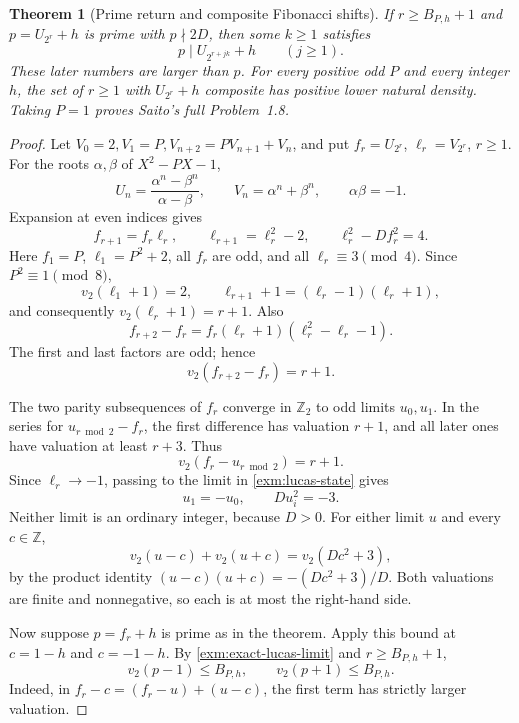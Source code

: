\documentclass[11pt,a4paper]{article}
\numberwithin{equation}{section}
\newtheorem{theorem}{Theorem}[section]
\theoremstyle{definition}
\theoremstyle{remark}
\begin{document}
\begin{theorem}[Prime return and composite Fibonacci shifts]
\label{exm:fib-theorem}
If \(r\ge B_{P,h}+1\) and \(p=U_{2^r}+h\) is prime with
\(p\nmid2D\), then some \(k\ge1\) satisfies
\[
 p\mid U_{2^{r+jk}}+h\qquad(j\ge1).
\]
These later numbers are larger than \(p\).
For every positive odd \(P\) and every integer \(h\),
the set of \(r\ge1\) with \(U_{2^r}+h\) composite has
positive lower natural density. Taking \(P=1\) proves
Saito's full Problem~1.8.
\end{theorem}
\begin{proof}
Let \(V_0=2,V_1=P,V_{n+2}=PV_{n+1}+V_n\), and put
\(f_r=U_{2^r}\), \(\ell_r=V_{2^r}\), \(r\ge1\).
For the roots \(\alpha,\beta\) of \(X^2-PX-1\),
\[
 U_n=\frac{\alpha^n-\beta^n}{\alpha-\beta},
 \qquad V_n=\alpha^n+\beta^n,\qquad \alpha\beta=-1.
\]
Expansion at even indices gives
\begin{equation}\label{exm:lucas-state}
 f_{r+1}=f_r\ell_r,\qquad
 \ell_{r+1}=\ell_r^2-2,\qquad
 \ell_r^2-Df_r^2=4.
\end{equation}
Here \(f_1=P\), \(\ell_1=P^2+2\), all \(f_r\) are odd,
and all \(\ell_r\equiv3\pmod4\).
Since \(P^2\equiv1\pmod8\),
\[
 v_2(\ell_1+1)=2,\qquad
 \ell_{r+1}+1=(\ell_r-1)(\ell_r+1),
\]
and consequently \(v_2(\ell_r+1)=r+1\). Also
\[
 f_{r+2}-f_r
 =f_r(\ell_r+1)(\ell_r^2-\ell_r-1).
\]
The first and last factors are odd; hence
\begin{equation}\label{exm:lucas-rate}
 v_2(f_{r+2}-f_r)=r+1.
\end{equation}

The two parity subsequences of \(f_r\) converge in
\(\mathbb Z_2\) to odd limits \(u_0,u_1\). In the
series for \(u_{r\bmod2}-f_r\), the first difference
has valuation \(r+1\), and all later ones have valuation
at least \(r+3\). Thus
\begin{equation}\label{exm:exact-lucas-limit}
 v_2(f_r-u_{r\bmod2})=r+1.
\end{equation}
Since \(\ell_r\to-1\), passing to the limit in
\eqref{exm:lucas-state} gives
\[
 u_1=-u_0,\qquad Du_i^2=-3.
\]
Neither limit is an ordinary integer, because \(D>0\).
For either limit \(u\) and every \(c\in\mathbb Z\),
\[
 v_2(u-c)+v_2(u+c)=v_2(Dc^2+3),
\]
by the product identity
\((u-c)(u+c)=-(Dc^2+3)/D\).
Both valuations are finite and nonnegative, so each
is at most the right-hand side.

Now suppose \(p=f_r+h\) is prime as in the theorem.
Apply this bound at \(c=1-h\) and \(c=-1-h\).
By \eqref{exm:exact-lucas-limit} and \(r\ge B_{P,h}+1\),
\begin{equation}\label{exm:two-budget}
 v_2(p-1)\le B_{P,h},\qquad v_2(p+1)\le B_{P,h}.
\end{equation}
Indeed, in \(f_r-c=(f_r-u)+(u-c)\), the first term
has strictly larger valuation.


\end{proof}
\end{document}
